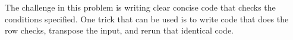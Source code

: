
\noindent
The challenge in this problem is writing clear concise code
that checks the conditions specified.  One trick that can be used
is to write code that does the row checks, transpose the input,
and rerun that identical code.
